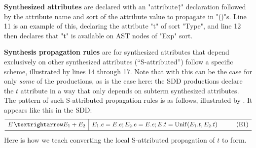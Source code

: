 \documentclass{article}
\begin{document}
\smallskip\noindent\textbf{Synthesized attributes} are declared with an "attribute↑" declaration followed by the
  attribute name and sort of the attribute value to propagate in "()"s. Line 11 is an example of
  this, declaring the attribute "t" of sort "Type", and line 12 then declares that "t" is available
  on AST nodes of "Exp" sort.

\smallskip\noindent\textbf{Synthesis propagation rules} are for synthesized attributes that depend exclusively on other
  synthesized attributes (``S-attributed'') follow a specific scheme, illustrated by lines 14
  through 17.  Note that with \HAX this can be the case for only \emph{some} of the productions, as
  is the case here: the SDD productions  declare the $t$ attribute in a way that only
  depends on subterm synthesized attributes.  The pattern of such S-attributed propagation rules is
  as follows, illustrated by .  It appears like this in the SDD:
  \begin{equation*}
    \begin{array}{r@{\,}l|lr}
      \hline\Bigstrut
      E &→ E_1 + E_2 & E_1.e=E.e; E_2.e=E.e; E.t = \op{Unif}(E_1.t, E_2.t) \qquad&\thetag{E1}\\[\jot]
      \hline
    \end{array}
  \end{equation*}
  Here is how we teach converting the local S-attributed propagation of $t$ to \HAX form.
\end{document}
